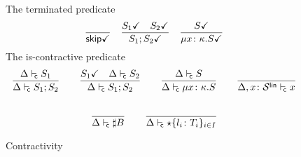 \begin{figure}[tp]
  The terminated predicate \hfill{}
  \begin{equation*}
    \frac{}{{\mathsf{skip}}\checkmark}
    \quad
    \frac{
      {S_1}\checkmark
      \quad
      {S_2}\checkmark
    }{
      {S_1;S_2}\checkmark
    }
    \quad
    \frac{
      {S}\checkmark
    }{
      {\mu{x\colon\kappa}.{S}}\checkmark
}
  \end{equation*}
  The is-contractive predicate \hfill{}
  \begin{gather*}
    \frac{
      \isContr{S_1}
    }{
      \isContr{S_1;S_2}
    }
    \qquad
    \frac{
      \isDone{S_1}
      \quad
      \isContr{S_2}
    }{
      \isContr{S_1;S_2}
    }
    \qquad
    \frac{
      \isContr S
    }{
      \isContr{\rect{x\colon\kind}S}
    }
    \qquad
    \frac{}{
      \isContr[\Delta,x\colon\kindk\kinds\link] x
    }
    \\\\
    \frac{}
    {
      \isContr {\sharp B}
    }
    \qquad
    \frac{}
    {
      \isContr {\star \{ l_i \colon T_i\}_{i\in I}}
    }
  \end{gather*}
  \caption{Contractivity}
  \label{fig:contractivity}
\end{figure}





